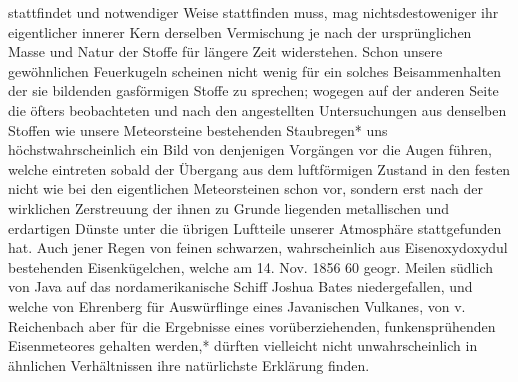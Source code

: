 \documentclass[a4paper, 8pt, oneside, polutonikogreek, german]{article}
\begin{document}
stattfindet und notwendiger Weise stattfinden muss, mag nichtsdestoweniger ihr eigentlicher innerer Kern derselben Vermischung je nach der ursprünglichen Masse und Natur der Stoffe für längere Zeit widerstehen. Schon unsere gewöhnlichen Feuerkugeln scheinen nicht wenig für ein solches Beisammenhalten der sie bildenden gasförmigen Stoffe zu sprechen; wogegen auf der anderen Seite die öfters beobachteten und nach den angestellten Untersuchungen aus denselben Stoffen wie unsere Meteorsteine bestehenden Staubregen* uns höchstwahrscheinlich ein Bild von denjenigen Vorgängen vor die Augen führen, welche eintreten sobald der Übergang aus dem luftförmigen Zustand in den festen nicht wie bei den eigentlichen Meteorsteinen schon vor, sondern erst nach der wirklichen Zerstreuung der ihnen zu Grunde liegenden metallischen und erdartigen Dünste unter die übrigen Luftteile unserer Atmosphäre stattgefunden hat. Auch jener Regen von feinen schwarzen, wahrscheinlich aus Eisenoxydoxydul bestehenden Eisenkügelchen, welche am 14. Nov. 1856 60 geogr. Meilen südlich von Java auf das nordamerikanische Schiff Joshua Bates niedergefallen, und welche von Ehrenberg für Auswürflinge eines Javanischen Vulkanes, von v. Reichenbach aber für die Ergebnisse eines vorüberziehenden, funkensprühenden Eisenmeteores gehalten werden,* dürften vielleicht nicht unwahrscheinlich in ähnlichen Verhältnissen ihre natürlichste Erklärung finden.
\end{document}
